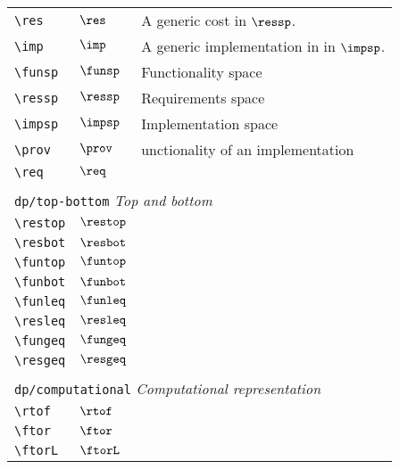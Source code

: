 \begin{longtable}{lll}
 {\color[rgb]{0.5,0.5,0.5}\texttt{\textbackslash res}} & $\res$ &  A generic cost in $\ressp$.\\ 
 {\color[rgb]{0.5,0.5,0.5}\texttt{\textbackslash imp}} & $\imp$ &  A generic implementation in in $\impsp$.\\ 
 {\color[rgb]{0.5,0.5,0.5}\texttt{\textbackslash funsp}} & $\funsp$ &  Functionality space\\ 
 {\color[rgb]{0.5,0.5,0.5}\texttt{\textbackslash ressp}} & $\ressp$ &  Requirements space\\ 
 {\color[rgb]{0.5,0.5,0.5}\texttt{\textbackslash impsp}} & $\impsp$ &  Implementation space\\ 
 {\color[rgb]{0.5,0.5,0.5}\texttt{\textbackslash prov}} & $\prov$ &  unctionality of an implementation\\ 
 {\color[rgb]{0.5,0.5,0.5}\texttt{\textbackslash req}} & $\req$ & \\ 
  &  & \\ 
 \multicolumn{3}{l}{{\color[rgb]{0.5,0.5,0.5}\texttt{dp/top-bottom}} \emph{Top and bottom}}\\ 
 \hline
{\color[rgb]{0.5,0.5,0.5}\texttt{\textbackslash restop}} & $\restop$ & \\ 
 {\color[rgb]{0.5,0.5,0.5}\texttt{\textbackslash resbot}} & $\resbot$ & \\ 
 {\color[rgb]{0.5,0.5,0.5}\texttt{\textbackslash funtop}} & $\funtop$ & \\ 
 {\color[rgb]{0.5,0.5,0.5}\texttt{\textbackslash funbot}} & $\funbot$ & \\ 
 {\color[rgb]{0.5,0.5,0.5}\texttt{\textbackslash funleq}} & $\funleq$ & \\ 
 {\color[rgb]{0.5,0.5,0.5}\texttt{\textbackslash resleq}} & $\resleq$ & \\ 
 {\color[rgb]{0.5,0.5,0.5}\texttt{\textbackslash fungeq}} & $\fungeq$ & \\ 
 {\color[rgb]{0.5,0.5,0.5}\texttt{\textbackslash resgeq}} & $\resgeq$ & \\ 
  &  & \\ 
 \multicolumn{3}{l}{{\color[rgb]{0.5,0.5,0.5}\texttt{dp/computational}} \emph{Computational representation}}\\ 
 \hline
{\color[rgb]{0.5,0.5,0.5}\texttt{\textbackslash rtof}} & $\rtof$ & \\ 
 {\color[rgb]{0.5,0.5,0.5}\texttt{\textbackslash ftor}} & $\ftor$ & \\ 
 {\color[rgb]{0.5,0.5,0.5}\texttt{\textbackslash ftorL}} & $\ftorL$ & \\ 

\end{longtable}
